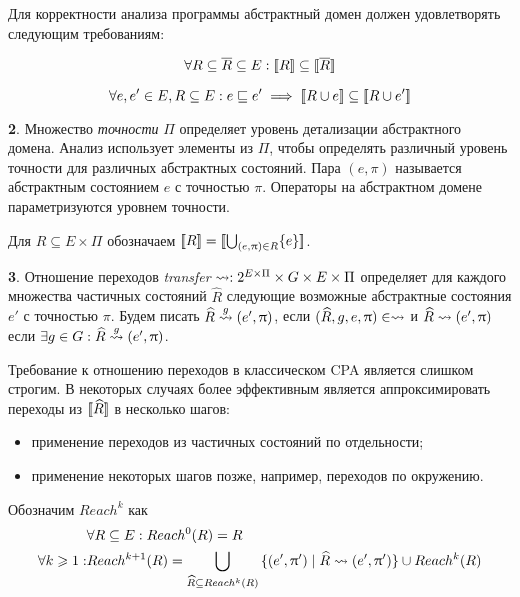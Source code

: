 Для корректности анализа программы абстрактный домен должен удовлетворять следующим требованиям:

\begin{equation}
\label{cpa_conc_eq_0}
\forall R \subseteq \overline{R} \subseteq E: [\![ R ]\!] \subseteq [\![ \overline R ]\!]
\end{equation}

\begin{equation}
\label{cpa_conc_eq_2}
\forall e, e' \in E, R \subseteq E : e \sqsubseteq e' \implies [\![ R \cup e ]\!] \subseteq [\![ R \cup e' ]\!]
\end{equation}

{\textbf 2.} Множество \emph{точности} $\Pi$ определяет уровень детализации абстрактного домена. Анализ использует элементы из $\Pi$, чтобы определять различный уровень точности для различных абстрактных состояний.
Пара $(e, \pi)$ называется абстрактным состоянием $e$ с точностью $\pi$.
Операторы на абстрактном домене параметризуются уровнем точности.

Для $R \subseteq E \times \Pi$ обозначаем
$[\![ R ]\!] = [\![ \bigcup_{(e,\uppi)\in R}\{e\} ]\!]$.

{\textbf 3.} Отношение переходов \emph{transfer} $\leadsto: 2^{E\times \Pi} \times G \times E \times \Pi$ определяет для каждого множества частичных состояний $\widehat{R}$ следующие возможные абстрактные состояния $e'$ с точностью $\pi$.
Будем писать $\widehat{R} \stackrel{g}{\leadsto} (e', \uppi)$, если $(\widehat{R}, g, e, \uppi) \in \leadsto$ и $\widehat{R} \leadsto (e', \uppi)$ если $\exists g \in G: \widehat{R} \stackrel{g}{\leadsto} (e', \uppi)$.


Требование к отношению переходов в классическом CPA является слишком строгим.
В некоторых случаях более эффективным является аппроксимировать переходы из $[\![ \widehat{R} ]\!]$  в несколько шагов:
\begin{itemize}
\item применение переходов из частичных состояний по отдельности;
\item применение некоторых шагов позже, например, переходов по окружению.
\end{itemize}

Обозначим $Reach^k$ как
\begin{equation}
\label{reach_k}
\begin{aligned}
& \forall R \subseteq E: Reach^0(R) = R \\
\forall k\geqslant 1:& Reach^{k+1}(R) = \bigcup_{\widehat{R} \subseteq Reach^{k}(R)}{\{(e',\uppi') \mid \widehat{R} \leadsto (e',\uppi')\}} \cup Reach^{k}(R) \\
\end{aligned}
\end{equation}

